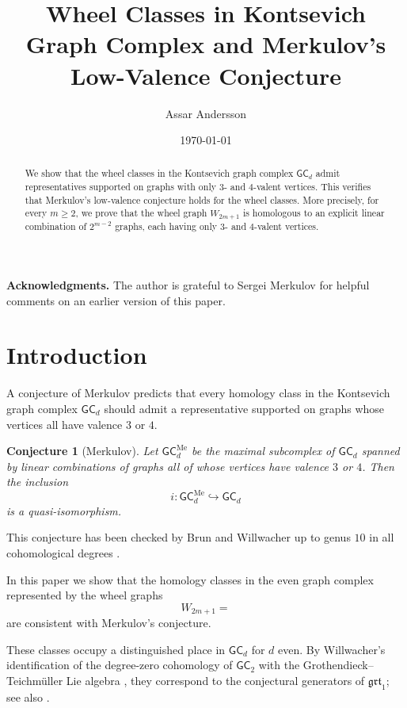 \documentclass[11pt]{article}
\title{Wheel Classes in Kontsevich Graph Complex and Merkulov's Low-Valence Conjecture}
\author{Assar Andersson}
\date{\today}
\theoremstyle{definition}
\theoremstyle{plain}
\newtheorem{conjecture}[definition]{Conjecture}
\newcommand{\GC}{\mathsf{GC}}
\begin{document}
\maketitle

\begin{abstract}
We show that the wheel classes in the Kontsevich graph complex $\GC_d$ admit representatives supported on graphs with only
$3$- and $4$-valent vertices. This verifies that Merkulov’s low-valence conjecture holds for the wheel classes.
 More precisely, for every $m \ge 2$, we prove that the wheel graph $W_{2m+1}$ is homologous to an explicit linear combination of $2^{m-2}$ graphs, each having only $3$- and $4$-valent vertices.
\end{abstract}

\medskip
\noindent\textbf{Acknowledgments.} The author is grateful to Sergei Merkulov for helpful comments on an earlier version of this paper.

\section{Introduction}
A conjecture of Merkulov predicts that every homology class in the Kontsevich graph complex $\GC_d$ should admit a representative supported on graphs whose vertices all have valence $3$ or $4$.

\begin{conjecture}[Merkulov]\label{conj:merkulov}
Let $\GC_d^{\mathrm{Me}}$ be the maximal subcomplex of $\GC_d$ spanned by linear combinations of graphs all of whose vertices have valence $3$ or $4$.
Then the inclusion
\[
i \colon \GC_d^{\mathrm{Me}}\hookrightarrow \GC_d
\]
is a quasi-isomorphism.
\end{conjecture}

This conjecture has been checked by Brun and Willwacher up to genus $10$ in all cohomological degrees \cite{BrunWillwacher2024}.

In this paper we show that the homology classes in the even graph complex represented by the wheel graphs
\[
W_{2m+1} =

\]
are consistent with Merkulov’s conjecture.

These classes occupy a distinguished place in $\GC_d$ for $d$ even. By Willwacher's identification of the degree-zero cohomology of 
$\GC_2$ with the Grothendieck--Teichm\"uller Lie algebra \cite{Willwacher2015}, 
they correspond to the conjectural generators of $\mathfrak{grt}_1$; see also \cite{MerkulovSurvey}.
\end{document}
